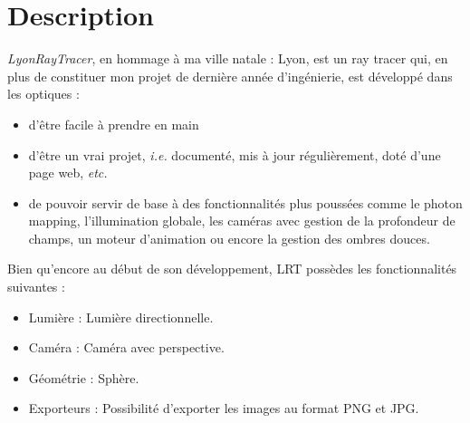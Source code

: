 \section{Description}
\textsl{LyonRayTracer}, en hommage à ma ville natale : Lyon, est un ray tracer
qui, en plus de constituer mon projet de dernière année d'ingénierie, est
développé dans les optiques :
\begin{itemize}
  \item d'être facile à prendre en main
  \item d'être un vrai projet, \textsl{i.e.} documenté, mis à jour
  régulièrement, doté d'une page web, \textsl{etc.}
  \item de pouvoir servir de base à des fonctionnalités plus poussées comme le
  photon mapping, l'illumination globale, les caméras avec gestion de la
  profondeur de champs, un moteur d'animation ou encore la gestion des ombres
  douces.
\end{itemize}

Bien qu'encore au début de son développement, LRT possèdes les fonctionnalités
suivantes :
\begin{itemize}
  \item Lumière : Lumière directionnelle.
  \item Caméra : Caméra avec perspective.
  \item Géométrie : Sphère.
  \item Exporteurs : Possibilité d'exporter les images au format PNG et JPG.
\end{itemize}
